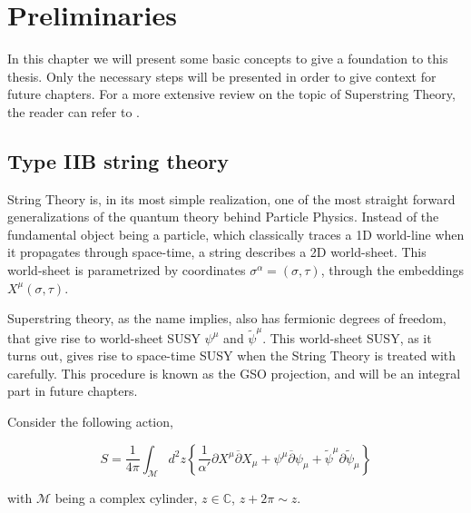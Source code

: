 

\chapter{Preliminaries}
\label{chap:preliminaries}
\pagestyle{fancy}

In this chapter we will present some basic concepts to give a foundation to this thesis. Only the necessary steps will be presented in order to give context for future chapters. For a more extensive review on the topic of Superstring Theory, the reader can refer to \cite{Polchinski_1998,Johnson_2023}.

\section{Type IIB string theory}


String Theory is, in its most simple realization, one of the most straight forward generalizations of the quantum theory behind Particle Physics. Instead of the fundamental object being a particle, which classically traces a 1D world-line when it propagates through space-time, a string describes a 2D world-sheet. This world-sheet is parametrized by coordinates $\sigma^\alpha = (\sigma,\tau)$, through the embeddings $X^\mu(\sigma,\tau)$.

Superstring theory, as the name implies, also has fermionic degrees of freedom, that give rise to world-sheet SUSY $\psi^\mu$ and $\tilde{\psi}^\mu$. This world-sheet SUSY, as it turns out, gives rise to space-time SUSY when the String Theory is treated with carefully. This procedure is known as the GSO projection, and will be an integral part in future chapters.

Consider the following action,

\begin{equation*}
    \label{eq:worldsheet_action}
    S = \frac{1}{4\pi} \int_\mathcal{M} d^2 z \left\{ \frac{1}{\alpha '} \partial X^\mu \overline{\partial} X_\mu + \psi^\mu \overline{\partial} \psi_\mu + \tilde{\psi}^\mu \partial \tilde{\psi}_\mu\right\}
\end{equation*}

with $\mathcal{M}$ being a complex cylinder, $z\in \mathbb{C}$, $z + 2\pi \sim z$.

